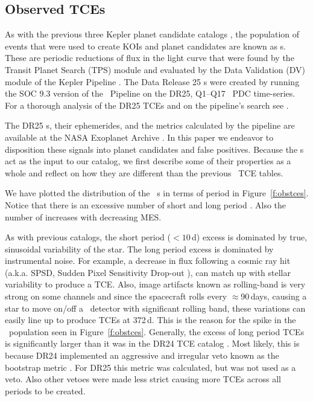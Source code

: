 \subsection{Observed TCEs}

\label{s:tces}
As with the previous three Kepler planet candidate catalogs \citep{Coughlin2016,Mullally2015cat,Rowe2015cat}, the population of events that were used to create KOIs and planet candidates are known as \opstce s. These are periodic reductions of flux in the light curve that were found by the Transit Planet Search (TPS) module and evaluated by the Data Validation (DV) module of the Kepler Pipeline \citep{JenkinsKDPH}.   The Data Release 25 \opstce s were created by running the SOC 9.3 version of the \Kepler\ Pipeline on the DR25, Q1--Q17 \Kepler\ PDC time-series.  For a thorough analysis of the DR25 TCEs and on the pipeline's search see \citet{Twicken2016}. 

The DR25 \opstce s, their ephemerides, and the metrics calculated by the pipeline are available at the NASA Exoplanet Archive \citep{Akeson2013}.  In this paper we endeavor to disposition these signals into planet candidates and false positives.  Because the \opstce s act as the input to our catalog, we first describe some of their properties as a whole and reflect on how they are different than the previous \Kepler\ TCE tables.

We have plotted the distribution of the \ntcesnorogue\ \opstce s in terms of period in Figure~\ref{f:obstces}. Notice that there is an excessive number of short and long period . Also the number of  increases with decreasing MES. 

As with previous catalogs, the short period ($<10$\,d) excess is dominated by true, sinusoidal variability of the star. The long period excess is dominated by instrumental noise. For example, a decrease in flux following a cosmic ray hit (a.k.a. SPSD, Sudden Pixel Sensitivity Drop-out \citep{KDCH}), can match up with stellar variability to produce a TCE. Also, image artifacts known as rolling-band is very strong on some channels \citep[see \S6.7 of][]{KIH}  and since the spacecraft rolls every $\approx$90\,days, causing a star to move on/off a \Kepler\ detector with significant rolling band, these variations can easily line up to produce TCEs at 372\,d. This is the reason for the spike in the \opstce\ population seen in Figure~\ref{f:obstces}. Generally, the excess of long period TCEs is significantly larger than it was in the DR24 TCE catalog \citep{Seader2015}. Most likely, this is because DR24 implemented an aggressive and irregular veto known as the bootstrap metric \citep{JenkinsBootstrap}.  For DR25 this metric was calculated, but was not used as a veto. Also other vetoes were made less strict causing more TCEs across all periods to be created. 

